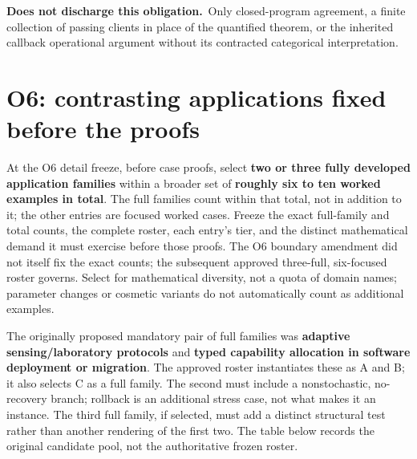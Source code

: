 \documentclass[11pt,a4paper]{article}
\newcommand{\notaccepted}{\par\textbf{Does not discharge this obligation.}\ }
\begin{document}
\notaccepted Only closed-program agreement, a finite collection of passing
clients in place of the quantified theorem, or the inherited callback
operational argument without its contracted categorical interpretation.

\section{O6: contrasting applications fixed before the proofs}\label{sec:o6}

At the O6 detail freeze, before case proofs, select
\textbf{two or three fully developed application families}
within a broader set of \textbf{roughly six to ten worked examples in total}.
The full families count within that total, not in addition to it; the other
entries are focused worked cases. Freeze the exact full-family and total
counts, the complete roster, each entry's tier, and the distinct mathematical
demand it must exercise before those proofs. The O6 boundary amendment did
not itself fix the exact counts; the subsequent approved three-full,
six-focused roster governs. Select for mathematical diversity, not a quota of domain
names; parameter changes or cosmetic variants do not automatically count as
additional examples.

The originally proposed mandatory pair of full families was
\textbf{adaptive sensing/laboratory protocols} and \textbf{typed capability
allocation in software deployment or migration}. The approved roster
instantiates these as A and B; it also selects C as a full family. The second must include a nonstochastic,
no-recovery branch; rollback is an additional stress case, not what makes
it an instance. The third full family, if selected, must add a distinct
structural test rather than another rendering of the first two. The table
below records the original candidate pool, not the authoritative frozen roster.
\end{document}

